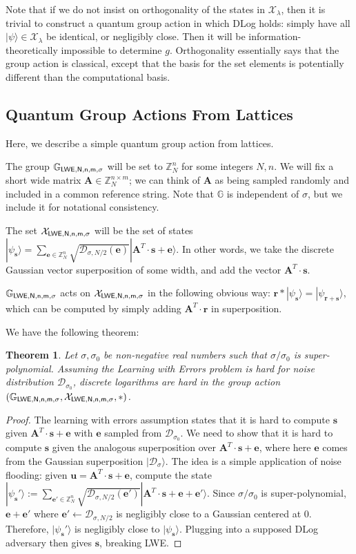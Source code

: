 \documentclass{article}\usepackage[a4paper,margin=20mm]{geometry}
\newtheorem{theorem}{Theorem}\newtheorem{lemma}[theorem]{Lemma}\newtheorem{proposition}[theorem]{Proposition}\newtheorem{corollary}[theorem]{Corollary}\newtheorem{definition}[theorem]{Definition}\newtheorem{claim}[theorem]{Claim}\newtheorem{remark}[theorem]{Remark}\newtheorem{observation}[theorem]{Observation}\newtheorem{conjecture}[theorem]{Conjecture}\newtheorem{example}[theorem]{Example}
\numberwithin{theorem}{section}
\numberwithin{equation}{section}
\newcommand{\Z}{\mathbb{Z}}
\newcommand{\G}{\mathbb{G}}
\newcommand{\ev}{{\mathbf{e}}}
\newcommand{\rv}{{\mathbf{r}}}
\newcommand{\sv}{{\mathbf{s}}}
\newcommand{\uv}{{\mathbf{u}}}
\newcommand{\Am}{{\mathbf{A}}}
\newcommand{\Ds}{{\mathcal{D}}}
\newcommand{\Xs}{{\mathcal{X}}}
\begin{document}
Note that if we do not insist on orthogonality of the states in $\Xs_\lambda$, then it is trivial to construct a quantum group action in which DLog holds: simply have all $|\psi\rangle\in\Xs_\lambda$ be identical, or negligibly close. Then it will be information-theoretically impossible to determine $g$. Orthogonality essentially says that the group action is classical, except that the basis for the set elements is potentially different than the computational basis.


\subsection{Quantum Group Actions From Lattices}

Here, we describe a simple quantum group action from lattices.

The group $\G_{\sf LWE,N,n,m,\sigma}$ will be set to $\Z_N^n$ for some integers $N,n$. We will fix a short wide matrix $\Am\in\Z_N^{n\times m}$; we can think of $\Am$ as being sampled randomly and included in a common reference string. Note that $\G$ is independent of $\sigma$, but we include it for notational consistency.

The set $\Xs_{\sf LWE,N,n,m,\sigma}$ will be the set of states $|\psi_\sv\rangle=\sum_{\ev\in\Z_N^n}\sqrt{\Ds_{\sigma,N/2}(\ev)}|\Am^T\cdot\sv+\ev\rangle$. In other words, we take the discrete Gaussian vector superposition of some width, and add the vector $\Am^T\cdot\sv$.

$\G_{\sf LWE,N,n,m,\sigma}$ acts on $\Xs_{\sf LWE,N,n,m,\sigma}$ in the following obvious way: $\rv*|\psi_\sv\rangle=|\psi_{\rv+\sv}\rangle$, which can be computed by simply adding $\Am^T\cdot\rv$ in superposition.

We have the following theorem:
\begin{theorem}\label{def:qdlogfromlwe} Let $\sigma,\sigma_0$ be non-negative real numbers such that $\sigma/\sigma_0$ is super-polynomial. Assuming the Learning with Errors problem is hard for noise distribution $\Ds_{\sigma_0}$, discrete logarithms are hard in the group action $(\G_{\sf LWE,N,n,m,\sigma},\Xs_{\sf LWE,N,n,m,\sigma},*)$.
\end{theorem}
\begin{proof}The learning with errors assumption states that it is hard to compute $\sv$ given $\Am^T\cdot\sv+\ev$ with $\ev$ sampled from $\Ds_{\sigma_0}$. We need to show that it is hard to compute $\sv$ given the analogous superposition over $\Am^T\cdot\sv+\ev$, where here $\ev$ comes from the Gaussian superposition $|\Ds_\sigma\rangle$. The idea is a simple application of noise flooding: given $\uv=\Am^T\cdot\sv+\ev$, compute the state $|\psi_\sv'\rangle:=\sum_{\ev'\in\Z_N^n}\sqrt{\Ds_{\sigma,N/2}(\ev')}|\Am^T\cdot\sv+\ev+\ev'\rangle$. Since $\sigma/\sigma_0$ is super-polynomial, $\ev+\ev'$ where $\ev'\gets \Ds_{\sigma,N/2}$ is negligibly close to a Gaussian centered at 0. Therefore, $|\psi_\sv'\rangle$ is negligibly close to $|\psi_\sv\rangle$. Plugging into a supposed DLog adversary then gives $\sv$, breaking LWE.
\end{proof}
\end{document}
